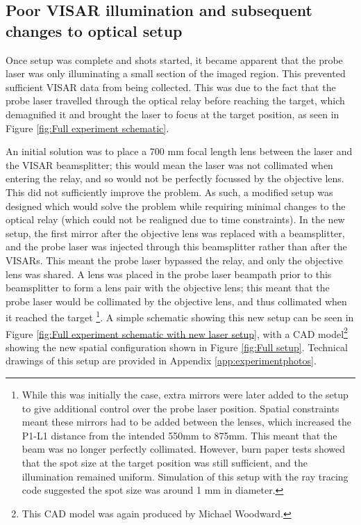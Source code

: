 \subsection{Poor VISAR illumination and subsequent changes to optical setup}

Once setup was complete and shots started, it became apparent that the probe laser was only illuminating a small section of the imaged region. This prevented sufficient VISAR data from being collected. This was due to the fact that the probe laser travelled through the optical relay before reaching the target, which demagnified it and brought the laser to focus at the target position, as seen in Figure \ref{fig:Full experiment schematic}. 

An initial solution was to place a 700 \unit{\milli\meter} focal length lens between the laser and the VISAR beamsplitter; this would mean the laser was not collimated when entering the relay, and so would not be perfectly focussed by the objective lens. This did not sufficiently improve the problem. As such, a modified setup was designed which would solve the problem while requiring minimal changes to the optical relay (which could not be realigned due to time constraints). In the new setup, the first mirror after the objective lens was replaced with a beamsplitter, and the probe laser was injected through this beamsplitter rather than after the VISARs. This meant the probe laser bypassed the relay, and only the objective lens was shared. A lens was placed in the probe laser beampath prior to this beamsplitter to form a lens pair with the objective lens; this meant that the probe laser would be collimated by the objective lens, and thus collimated when it reached the target \footnote{While this was initially the case, extra mirrors were later added to the setup to give additional control over the probe laser position. Spatial constraints meant these mirrors had to be added between the lenses, which increased the P1-L1 distance from the intended 550mm to 875mm. This meant that the beam was no longer perfectly collimated. However, burn paper tests showed that the spot size at the target position was still sufficient, and the illumination remained uniform. Simulation of this setup with the ray tracing code suggested the spot size was around 1 mm in diameter.}. A simple schematic showing this new setup can be seen in Figure \ref{fig:Full experiment schematic with new laser setup}, with a CAD model\footnote{This CAD model was again produced by Michael Woodward.} showing the new spatial configuration shown in Figure \ref{fig:Full setup}. Technical drawings of this setup are provided in Appendix \ref{app:experimentphotos}.

